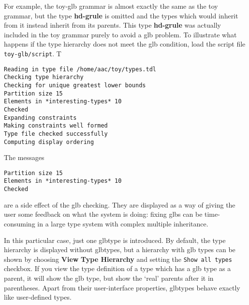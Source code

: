 \documentclass[12pt]{report}
\begin{document}
For example, the toy-glb
grammar is almost exactly the same as the toy grammar, but the
type {\bf hd-grule} is omitted and the types which would inherit
from it instead inherit from its parents.  This type {\bf hd-grule}
was actually included in the toy grammar purely to
avoid a glb problem.  To illustrate what happens if the type hierarchy does not
meet the glb condition,
load the script file {\tt toy-glb/script}.  T
\begin{verbatim}
Reading in type file /home/aac/toy/types.tdl
Checking type hierarchy
Checking for unique greatest lower bounds
Partition size 15
Elements in *interesting-types* 10
Checked
Expanding constraints
Making constraints well formed
Type file checked successfully
Computing display ordering
\end{verbatim}
The messages 
\begin{verbatim}
Partition size 15
Elements in *interesting-types* 10
Checked
\end{verbatim}
are a side effect of the glb checking.  They are displayed as a way
of giving the user some feedback on what the system is doing:
fixing glbs can be time-consuming in a large type system with
complex multiple inheritance.

In this particular case, just one glbtype is introduced.
By default, the type hierarchy is displayed
without glbtypes, but a hierarchy with glb types
can be shown by choosing
{\bf View} {\bf Type Hierarchy} and setting the {\tt Show all types}
checkbox.
If you view the type definition of a type which has a glb type as a parent,
it will show the glb type, but show the `real' parents after it 
in parentheses.
Apart from their user-interface properties, 
glbtypes behave exactly like user-defined types.
\end{document}

